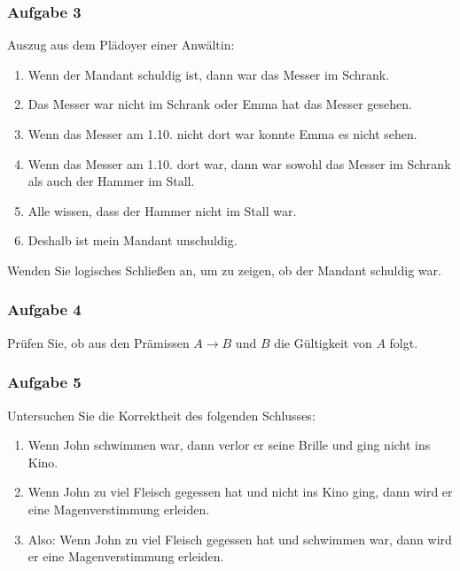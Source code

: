 \documentclass[a4paper,14pt,ngerman]{scrartcl}
\begin{document}
\subsubsection{\textbf{Aufgabe 3}}
\label{sec:org58642a1}

Auszug aus dem Plädoyer einer Anwältin:

\begin{enumerate}
\item Wenn der Mandant schuldig ist, dann war das Messer im Schrank.

\item Das Messer war nicht im Schrank oder Emma hat das Messer gesehen.

\item Wenn das Messer am 1.10. nicht dort war konnte Emma es nicht sehen.

\item Wenn das Messer am 1.10. dort war, dann war sowohl das Messer im
Schrank als auch der Hammer im Stall.

\item Alle wissen, dass der Hammer nicht im Stall war.

\item Deshalb ist mein Mandant unschuldig.
\end{enumerate}

Wenden Sie logisches Schließen an, um zu zeigen, ob der Mandant schuldig
war.
\subsubsection{\textbf{Aufgabe 4}}
\label{sec:org0fcc26c}

Prüfen Sie, ob aus den Prämissen \(A \rightarrow B\) und \(B\) die
Gültigkeit von \(A\) folgt.
\subsubsection{\textbf{Aufgabe 5}}
\label{sec:org64bfda5}

Untersuchen Sie die Korrektheit des folgenden Schlusses:

\begin{enumerate}
\item Wenn John schwimmen war, dann verlor er seine Brille und ging nicht
ins Kino.

\item Wenn John zu viel Fleisch gegessen hat und nicht ins Kino ging, dann
wird er eine Magenverstimmung erleiden.

\item Also: Wenn John zu viel Fleisch gegessen hat und schwimmen war, dann
wird er eine Magenverstimmung erleiden.
\end{enumerate}
\end{document}
